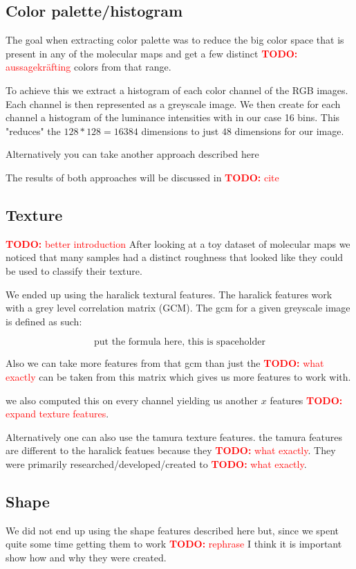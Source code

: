 \documentclass[journal]{vgtc}       %
\newcommand{\todo}[1]{\textcolor{red}{\textbf{TODO:} #1}}
\begin{document}
\subsection{Color palette/histogram }

The goal when extracting color palette was to reduce the big color space that is present in any of the molecular maps and get a few distinct \todo{aussagekräfting} colors from that range.

To achieve this we extract a histogram of each color channel of the RGB images. Each channel is then represented as a greyscale image. We then create for each channel a histogram of the luminance intensities with in our case 16 bins. This "reduces" the \(128*128 = 16384\) dimensions to just \(48\) dimensions for our image.

Alternatively you can take another approach described here

The results of both approaches will be discussed in \todo{cite}

\subsection{Texture}
\todo{better introduction}
After looking at a toy dataset of molecular maps we noticed that many samples had a distinct roughness that looked like they could be used to classify their texture.

We ended up using the haralick textural features. The haralick features work with a grey level correlation matrix (GCM). The gcm for a given greyscale image is defined as such:

\[\text{put the formula here, this is spaceholder}\]

Also we can take more features from that gcm than just the \todo{what exactly} can be taken from this matrix which gives us more features to work with.

we also computed this on every channel yielding us another \(x\) features \todo{expand texture features}.

Alternatively one can also use the tamura texture features. the tamura features are different to the haralick featues because they \todo{what exactly}.
They were primarily researched/developed/created to \todo{what exactly}. 	

\subsection{Shape}
We did not end up using the shape features described here but, since we spent quite some time getting them to work \todo{rephrase} I think it is important show how and why they were created.
\end{document}
